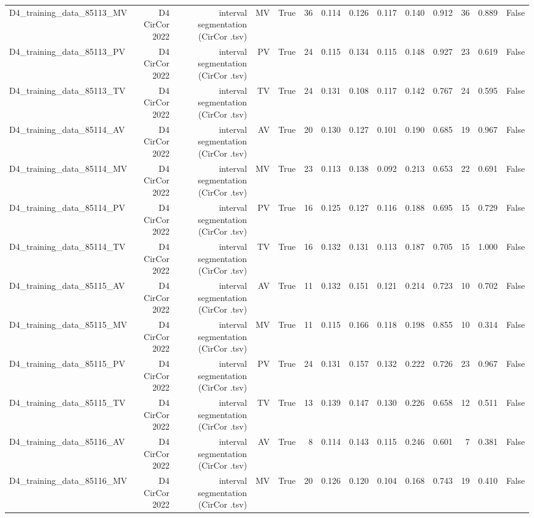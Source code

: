 \begin{table}[htbp]
\begin{tabular}{lrrrrrrrrrrrrr}
    D4\_training\_data\_85113\_MV & D4 CirCor 2022 & interval segmentation (CirCor .tsv) & MV & True & 36 & 0.114 & 0.126 & 0.117 & 0.140 & 0.912 & 36 & 0.889 & False \\
    D4\_training\_data\_85113\_PV & D4 CirCor 2022 & interval segmentation (CirCor .tsv) & PV & True & 24 & 0.115 & 0.134 & 0.115 & 0.148 & 0.927 & 23 & 0.619 & False \\
    D4\_training\_data\_85113\_TV & D4 CirCor 2022 & interval segmentation (CirCor .tsv) & TV & True & 24 & 0.131 & 0.108 & 0.117 & 0.142 & 0.767 & 24 & 0.595 & False \\
    D4\_training\_data\_85114\_AV & D4 CirCor 2022 & interval segmentation (CirCor .tsv) & AV & True & 20 & 0.130 & 0.127 & 0.101 & 0.190 & 0.685 & 19 & 0.967 & False \\
    D4\_training\_data\_85114\_MV & D4 CirCor 2022 & interval segmentation (CirCor .tsv) & MV & True & 23 & 0.113 & 0.138 & 0.092 & 0.213 & 0.653 & 22 & 0.691 & False \\
    D4\_training\_data\_85114\_PV & D4 CirCor 2022 & interval segmentation (CirCor .tsv) & PV & True & 16 & 0.125 & 0.127 & 0.116 & 0.188 & 0.695 & 15 & 0.729 & False \\
    D4\_training\_data\_85114\_TV & D4 CirCor 2022 & interval segmentation (CirCor .tsv) & TV & True & 16 & 0.132 & 0.131 & 0.113 & 0.187 & 0.705 & 15 & 1.000 & False \\
    D4\_training\_data\_85115\_AV & D4 CirCor 2022 & interval segmentation (CirCor .tsv) & AV & True & 11 & 0.132 & 0.151 & 0.121 & 0.214 & 0.723 & 10 & 0.702 & False \\
    D4\_training\_data\_85115\_MV & D4 CirCor 2022 & interval segmentation (CirCor .tsv) & MV & True & 11 & 0.115 & 0.166 & 0.118 & 0.198 & 0.855 & 10 & 0.314 & False \\
    D4\_training\_data\_85115\_PV & D4 CirCor 2022 & interval segmentation (CirCor .tsv) & PV & True & 24 & 0.131 & 0.157 & 0.132 & 0.222 & 0.726 & 23 & 0.967 & False \\
    D4\_training\_data\_85115\_TV & D4 CirCor 2022 & interval segmentation (CirCor .tsv) & TV & True & 13 & 0.139 & 0.147 & 0.130 & 0.226 & 0.658 & 12 & 0.511 & False \\
    D4\_training\_data\_85116\_AV & D4 CirCor 2022 & interval segmentation (CirCor .tsv) & AV & True & 8 & 0.114 & 0.143 & 0.115 & 0.246 & 0.601 & 7 & 0.381 & False \\
    D4\_training\_data\_85116\_MV & D4 CirCor 2022 & interval segmentation (CirCor .tsv) & MV & True & 20 & 0.126 & 0.120 & 0.104 & 0.168 & 0.743 & 19 & 0.410 & False \\

\end{tabular}
\end{table}
